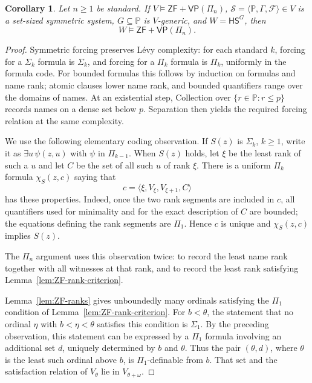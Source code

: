 \documentclass[11pt,a4paper]{amsart}
\newcommand{\VP}{\mathsf{VP}}
\newcommand{\ZF}{\mathsf{ZF}}
\newcommand{\HS}{\mathsf{HS}}
\theoremstyle{plain}
\newtheorem{corollary}[theorem]{Corollary}
\theoremstyle{definition}
\theoremstyle{remark}
\begin{document}
\begingroup

\begin{corollary}\label{cor:Pi-preservation}
Let $n\geq1$ be standard.  If $V\models\ZF+\VP(\Pi_n)$, $\mathscr S=\langle\mathbb P,\Gamma,\mathcal F\rangle\in V$ is a set-sized symmetric system, $G\subseteq\mathbb P$ is $V$-generic, and $W=\HS^G$, then
\[
W\models\ZF+\VP(\Pi_n).
\]
\end{corollary}

\begin{proof}
{Symmetric forcing preserves L\'evy complexity: for each standard $k$, forcing for a $\Sigma_k$ formula is $\Sigma_k$, and forcing for a $\Pi_k$ formula is $\Pi_k$, uniformly in the formula code.  For bounded formulas this follows by induction on formulas and name rank; atomic clauses lower name rank, and bounded quantifiers range over the domains of names.  At an existential step, Collection over $\{r\in\mathbb P:r\leq p\}$ records names on a dense set below $p$.  Separation then yields the required forcing relation at the same complexity.}

We use the following elementary coding observation.  If $S(z)$ is $\Sigma_k$, $k\geq1$, write it as $\exists u\,\psi(z,u)$ with $\psi$ in $\Pi_{k-1}$.  When $S(z)$ holds, let $\xi$ be the least rank of such a $u$ and let $C$ be the set of all such $u$ of rank $\xi$.  There is a uniform $\Pi_k$ formula $\chi_S(z,c)$ saying that
\[
c=\langle\xi,V_\xi,V_{\xi+1},C\rangle
\]
has these properties.  Indeed, once the two rank segments are included in $c$, all quantifiers used for minimality and for the exact description of $C$ are bounded; the equations defining the rank segments are $\Pi_1$.  Hence $c$ is unique and $\chi_S(z,c)$ implies $S(z)$.

The $\Pi_n$ argument uses this observation twice: to record the least name rank together with all witnesses at that rank, and to record the least rank satisfying Lemma~\ref{lem:ZF-rank-criterion}.

{Lemma~\ref{lem:ZF-ranks} gives unboundedly many ordinals satisfying the $\Pi_1$ condition of Lemma~\ref{lem:ZF-rank-criterion}.  For $b<\theta$, the statement that no ordinal $\eta$ with $b<\eta<\theta$ satisfies this condition is $\Sigma_1$.  By the preceding observation, this statement can be expressed by a $\Pi_1$ formula involving an additional set $d$, uniquely determined by $b$ and $\theta$.  Thus the pair $(\theta,d)$, where $\theta$ is the least such ordinal above $b$, is $\Pi_1$-definable from $b$.}  That set and the satisfaction relation of $V_\theta$ lie in $V_{\theta+\omega}$.


\end{proof}
\end{document}
